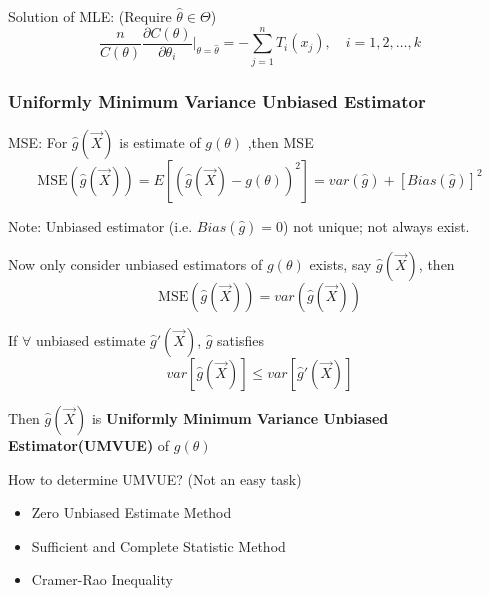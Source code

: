         Solution of MLE: (Require $\hat{\theta}\in\Theta$)
        \[
            \frac{n}{C(\theta)}\frac{\partial C(\theta)}{\partial \theta_i}\bigg|_{\theta=\hat{\theta}}=-\sum_{j=1}^nT_i(x_j),\quad i=1,2,\ldots,k    
        \]


\subsubsection{Uniformly Minimum Variance Unbiased Estimator}\label{SubSectionUMVUE}
        MSE: For $\hat{g}(\vec{X})$ is estimate of $g(\theta)$ ,then MSE
        \[
            \mathrm{MSE}(\hat{g}(\vec{X}))=E[(\hat{g}(\vec{X})-g(\theta))^2]=var(\hat{g})+[Bias(\hat{g})]^2
        \]

        Note:
    Unbiased estimator (i.e. $Bias(\hat{g})=0$) not unique; not always exist.


    


        Now only consider unbiased estimators of $g(\theta)$ exists, say $\hat{g}(\vec{X})$, then
        \[ \mathrm{MSE}(\hat{g}(\vec{X}))=var(\hat{g}(\vec{X})) \]

        If $\forall$ unbiased estimate $\hat{g}\prime(\vec{X})$, $\hat{g}$ satisfies
        \[
            var[\hat{g}(\vec{X})]\leq var[\hat{g}\prime(\vec{X})]    
        \]

\begin{point}
        Then $\hat{g}(\vec{X})$ is \textbf{Uniformly Minimum Variance Unbiased Estimator(UMVUE)} of $g(\theta)$
\end{point}


        How to determine UMVUE? (Not an easy task)
        \begin{itemize}
            \item Zero Unbiased Estimate Method
            \item Sufficient and Complete Statistic Method
            \item Cramer-Rao Inequality
        \end{itemize}

